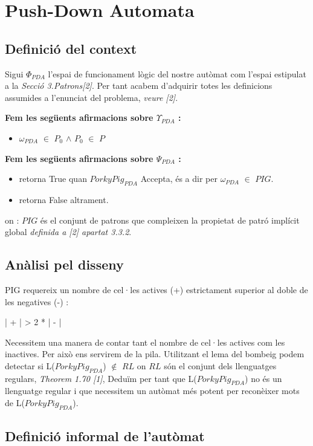 \documentclass[12pt,a4paper]{report}
\def \wpda{$\omega_{PDA} $}
\def \pda{$PorkyPig_{PDA} $}
\def \contextPDA{$\Phi_{PDA}$}
\def \prePDA{$\Upsilon_{PDA}$}
\def \postPDA{$\Psi_{PDA}$}
\begin{document}
\clearpage

\chapter{Push-Down Automata}

\section{Definició del context}

Sigui \contextPDA{} l'espai de funcionament lògic del nostre autòmat com l'espai estipulat a la \textit{Secció 3.Patrons[2]}. Per tant acabem d'adquirir totes les definicions assumides a l'enunciat del problema, \textit{veure [2]}.

\textbf{Fem les següents afirmacions sobre \prePDA{} :}
\begin{itemize}
\item \wpda{} $\in$ $P_0$ $\wedge$ $P_0$ $\in$ $P$
\end{itemize}

\textbf{Fem les següents afirmacions sobre \postPDA{} :}
\begin{itemize}
\item retorna True quan \pda{} Accepta, és a dir per \wpda{} $\in$ $PIG$.
\item retorna False altrament.
\end{itemize}
on : $PIG$ és el conjunt de patrons que compleixen la propietat de patró implícit global \textit{definida a [2] apartat 3.3.2}.

\section{Anàlisi pel disseny}

PIG requereix un nombre de cel·les actives (+) estrictament superior al doble de les negatives (-) :

\begin{center}
| + | > 2 * | - |
\end{center}

Necessitem una manera de contar tant el nombre de cel·les actives com les inactives. Per això ens servirem de la pila. Utilitzant el lema del bombeig podem detectar si L(\pda{}) $\not\in$ $RL$ on $RL$ són el conjunt dels llenguatges regulars, \textit{Theorem 1.70 [1]}, Deduïm per tant que L(\pda) no és un llenguatge regular i que necessitem un autòmat més potent per reconèixer mots de L(\pda).

\section{Definició informal de l’autòmat}
\end{document}
